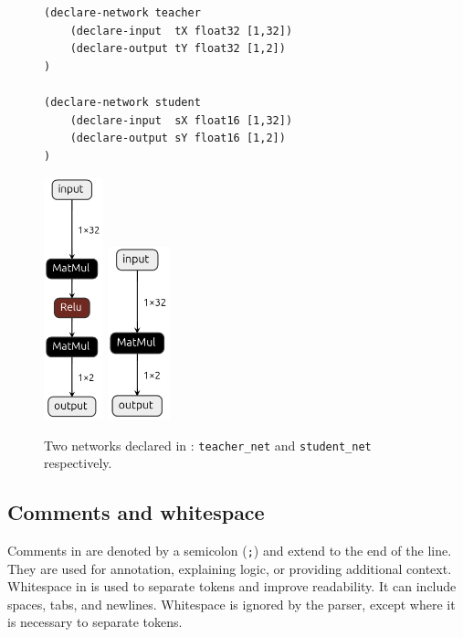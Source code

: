 \begin{figure}[h!]
    \begin{minipage}[c]{0.64\textwidth}
        \begin{lstlisting}[style=lbnf]
(declare-network teacher
    (declare-input  tX float32 [1,32])
    (declare-output tY float32 [1,2])
)

(declare-network student
    (declare-input  sX float16 [1,32])
    (declare-output sY float16 [1,2])
)\end{lstlisting}
    \end{minipage}
    \begin{minipage}[c]{0.35\textwidth}
        \centering
        \includegraphics[height=7cm]{imgs/teacher_net.onnx.png}
        \vspace{0.5cm} 
        \includegraphics[height=5cm]{imgs/student_net.onnx.png}
    \end{minipage}
    \caption{Two networks declared in \vnnlib{}: \texttt{teacher\_net} and \texttt{student\_net} respectively.}
    \label{fig:multiple-networks}
\end{figure}


\subsection{Comments and whitespace}

Comments in \vnnlib{} are denoted by a semicolon (\texttt{;}) and extend to the end of the line. They are used for annotation, explaining logic, or providing additional context. Whitespace in \vnnlib{} is used to separate tokens and improve readability. It can include spaces, tabs, and newlines. Whitespace is ignored by the parser, except where it is necessary to separate tokens.


